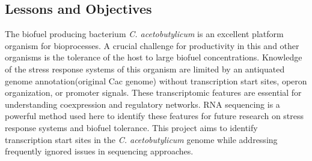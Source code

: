 \subsection{Lessons and Objectives}
The biofuel producing bacterium \textit{C. acetobutylicum} is an excellent platform organism for bioprocesses. A crucial challenge for productivity in this and other organisms is the tolerance of the host to large biofuel concentrations. Knowledge of the stress response systems of this organism are limited by an antiquated genome annotation(original Cac genome) without transcription start sites, operon organization, or promoter signals. These transcriptomic features are essential for understanding coexpression and regulatory networks. RNA sequencing is a powerful method used here to identify these features for future research on stress response systems and biofuel tolerance. This project aims to identify transcription start sites in the \textit{C. acetobutylicum} genome while addressing frequently ignored issues in sequencing approaches. 

